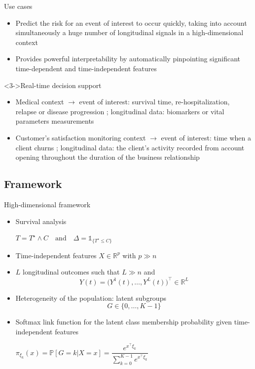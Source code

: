 \documentclass{beamer}
\newcommand{\R}{\mathbb R}
\renewcommand{\P}{\mathds{P}}
\newcommand{\ind}[1]{\mathds{1}_{#1}}
\renewcommand{\P}{\mathds P}
\begin{document}
\begin{frame}{Use cases}

\small
\begin{itemize}
  \item<1-> Predict the risk for an event of interest to occur quickly, taking into account simultaneously a huge number of longitudinal signals in a high-dimensional context
  \item<2-> Provides powerful interpretability by automatically pinpointing significant time-dependent and time-independent features
\end{itemize}

\begin{block}<3->{Real-time decision support}
\begin{itemize}
  \item<3-> Medical context $\rightarrow$ event of interest: survival time, re-hospitalization, relapse or disease progression ; longitudinal data: biomarkers or vital parameters measurements
  \item<4-> Customer's satisfaction monitoring context $\rightarrow$ event of interest: time when a client churns ; longitudinal data: the client's activity recorded from account opening throughout the duration of the business relationship
\end{itemize}
\end{block}

\end{frame}

\subsection{Framework}

\begin{frame}{High-dimensional framework}

\small
\begin{itemize}
  \item<1-> Survival analysis
  \begin{center}
  $T = T^\star \wedge C \quad \text{and} \quad \Delta = \ind{\{T^\star \leq C\}}$
  \end{center}
  \item<2-> Time-independent features $X \in \R^p$ with $p \gg n$
  \item<3-> $L$ longitudinal outcomes such that $L \gg n$ and \[Y(t) = \big(Y^1(t), \ldots, Y^L(t) \big)^\top \in \R^L\]
  \item<4-> Heterogeneity of the population: latent subgroups \[G \in \{ 0, \ldots, K-1\}\]
  \item<5-> Softmax link function for the latent class membership probability given time-independent features
  \begin{center}
  $\pi_{\xi_k}(x) = \P[G=k|X=x] = \dfrac{e^{x^\top\xi_k}}{\sum_{k=0}^{K-1}e^{x^\top\xi_k}}$
  \end{center}
\end{itemize}

\end{frame}
\end{document}
